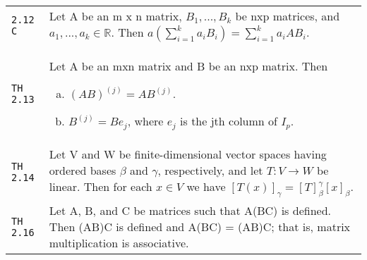 \documentclass[10pt,landscape]{article}
\begin{document}
\begin{multicols}{3}
\begin{tabular}{@{}p{\the\MyLen}%
                @{}p{\linewidth-\the\MyLen}@{}}
\verb!2.12 C! & Let A be an m x n matrix, $B_1,...,B_k$ be nxp matrices, and $a_1,...,a_k\!\in\!\mathbb{R}$. Then $a\left(\sum_{i=1}^k a_iB_i\right) = \sum_{i=1}^k a_iAB_i$.\\
\verb!TH 2.13! & Let A be an mxn matrix and B be an nxp matrix. Then
			\begin{enumerate}[a)]
			\item $(AB)^{(j)} = AB^{(j)}$.
			\item $B^{(j)} = Be_j$, where $e_j$ is the jth column of $I_p$.
			\end{enumerate}\\
\verb!TH 2.14! & Let V and W be finite-dimensional vector spaces having ordered bases $\beta$ and $\gamma$, respectively, and let $T:V\rightarrow W$ be linear. Then for each $x\!\in\! V$ we have $[T(x)]_\gamma = [T]_\beta^\gamma [x]_\beta$.\\
\verb!TH 2.16! & Let A, B, and C be matrices such that A(BC) is defined. Then (AB)C is defined and A(BC) = (AB)C; that is, matrix multiplication is associative.
\end{tabular}

\end{multicols}
\end{document}
